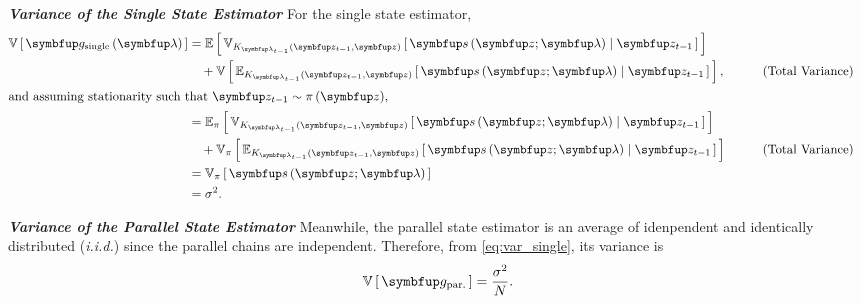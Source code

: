 \begin{proofEnd}

  \textit{\textbf{Variance of the Single State Estimator}}\quad
  For the single state estimator,  
  \begin{alignat}{2}
    \V{\vg_{\text{single}}\left(\vlambda\right)} 
    &= \E{ \Vsub{K_{\vlambda_{t-1}}\left(\vz_{t-1}, \vz\right)}{ \vs\left(\vz; \vlambda\right) \mid \vz_{t-1} }}  \nonumber \\
    &\quad + \V{ \Esub{K_{\vlambda_{t-1}}\left(\vz_{t-1}, \vz\right)}{ \vs\left(\vz; \vlambda\right) \mid \vz_{t-1} } },
    &&\qquad\text{(Total Variance)}
    \\
    \intertext{and assuming stationarity such that \(\vz_{t-1} \sim \pi\left(\vz\right)\),}
    &=
    \Esub{\pi}{ \Vsub{K_{\vlambda_{t-1}}\left(\vz_{t-1}, \vz\right)}{ \vs\left(\vz; \vlambda\right) \mid \vz_{t-1} }} \nonumber \\
    &\quad + \Vsub{\pi}{ \Esub{K_{\vlambda_{t-1}}\left(\vz_{t-1}, \vz\right)}{ \vs\left(\vz; \vlambda\right) \mid \vz_{t-1} } }
    &&\qquad\text{(Total Variance)}
    \\
    &= \Vsub{\pi}{\vs\left(\vz; \vlambda\right)}  \\
    &= \sigma^2.\label{eq:var_single}
  \end{alignat}

  \textit{\textbf{Variance of the Parallel State Estimator}}\quad
  Meanwhile, the parallel state estimator is an average of idenpendent and identically distributed (\textit{i.i.d.}) since the parallel chains are independent.
  Therefore, from \cref{eq:var_single}, its variance is 
  \begin{align}
    \V{\vg_{\text{par.}}} = \frac{\sigma^2}{N}.
  \end{align}


\end{proofEnd}
